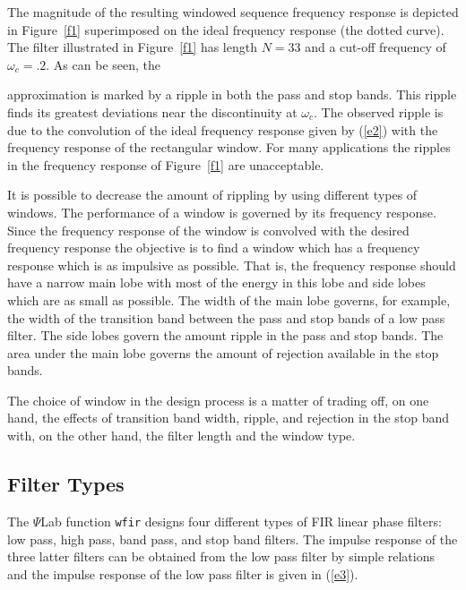 The magnitude of the resulting windowed sequence frequency response 
is depicted in Figure~\ref{f1} superimposed on the ideal frequency
response (the dotted curve).  The filter illustrated in Figure~\ref{f1} 
has length $N=33$ and
a cut-off frequency of $\omega_c=.2$.  As can be seen, the 
%

%
approximation is marked by a ripple in both the pass
and stop bands.  This ripple finds its greatest deviations near the discontinuity
at $\omega_c$.  The observed ripple is due to the convolution of the
ideal frequency response given by (\ref{e2}) with the frequency response
of the rectangular window.  For many applications the ripples in the frequency 
response of Figure~\ref{f1} are unacceptable.

It is possible to decrease the amount of rippling by using different 
types of windows.
The performance of a window is governed by its frequency response.
Since the
frequency response of the window is convolved with the 
desired frequency response the 
objective is to find a window which has a frequency response which
is as impulsive as possible.  That is,  the frequency response 
should have a narrow main lobe with most of the energy
in this lobe and side lobes which are as small as possible.
The width of the main lobe governs, for example, the width
of the transition band between the pass and stop 
bands of a low pass filter.  The side lobes govern the amount 
ripple in the pass and stop bands.  The area under the main lobe
governs the amount of rejection available in
the stop bands. 

The choice of window in the design process is a matter
of trading off, on one hand, the effects of 
transition band width, ripple, and rejection in the stop band with,
on the other hand, the filter length and the window type.

\subsection{Filter Types}
\label{s2}

The $\Psi$Lab function {\tt wfir} designs four different types
of FIR linear phase filters: low pass, high pass,
band pass, and stop band filters.  The impulse response of the three
latter filters can be obtained from the low pass filter by
simple relations and the impulse response of the
low pass filter is given in (\ref{e3}).

